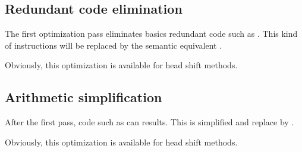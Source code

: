 \subsection{Redundant code elimination\label{RCE}}
The first optimization pass eliminates basics redundant code such as \ttt{+++++}. This kind of instructions will be replaced by the semantic equivalent .

Obviously, this optimization is available for head shift methods.

\subsection{Arithmetic simplification\label{AS}}
After the first pass, code such as  can results. This is simplified and replace by \ttt{-}.

Obviously, this optimization is available for head shift methods.
\nwenddocs{}
